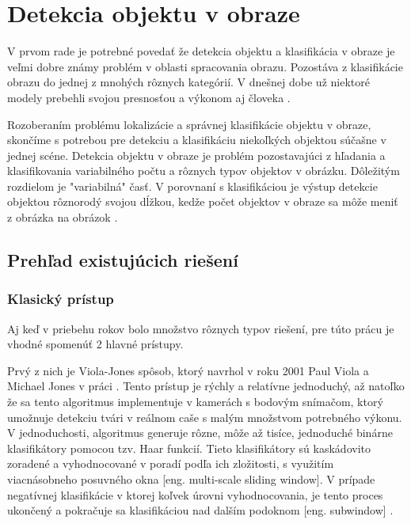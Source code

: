 
\section{Detekcia objektu v obraze}
\label{sec:detekcia}

V prvom rade je potrebné povedať že detekcia objektu a klasifikácia v obraze je veľmi dobre známy problém v oblasti spracovania obrazu.
Pozostáva z klasifikácie obrazu do jednej z mnohých rôznych kategórií.
V dnešnej dobe už niektoré modely prebehli svojou presnosťou a výkonom aj človeka \cite{prop:NNvsHuman}.

Rozoberaním problému lokalizácie a správnej klasifikácie objektu v obraze, skončíme s potrebou
    pre detekciu a klasifikáciu niekoľkých objektou súčašne v jednej scéne.
Detekcia objektu v obraze je problém pozostavajúci z hľadania a klasifikovania variabilného počtu a rôznych typov objektov v obrázku.
Dôležitým rozdielom je "variabilná" časť. V porovnaní s klasifikáciou je výstup detekcie objektou rôznorodý svojou dĺžkou, kedže
    počet objektov v obraze sa môže meniť z obrázka na obrázok \cite{odkaz:ObjectDetectionOverview}.

\subsection{Prehľad existujúcich riešení}

\subsubsection{Klasický prístup}
Aj keď v priebehu rokov bolo množstvo rôznych typov riešení, pre túto prácu je vhodné spomenúť 2 hlavné prístupy.

Prvý z nich je Viola-Jones spôsob, ktorý navrhol v roku 2001 Paul Viola a Michael Jones v práci \cite{prop:Viola2001RobustRF}.
Tento prístup je rýchly a relatívne jednoduchý, až natoľko že sa tento algoritmus implementuje v kamerách s bodovým snímačom, ktorý umožnuje
    detekciu tvári v reálnom caše s malým množstvom potrebného výkonu.
V jednoduchosti, algoritmus generuje rôzne, môže až tisíce, jednoduché binárne klasifikátory pomocou tzv. Haar funkcií.
Tieto klasifikátory sú kaskádovito zoradené a vyhodnocované v poradí podľa ich zložitosti, s využitím viacnásobneho posuvného okna [eng. multi-scale sliding window].
V prípade negatívnej klasifikácie v ktorej koľvek úrovni vyhodnocovania, je tento proces ukončený a pokračuje sa klasifikáciou nad dalším podoknom [eng. subwindow] \cite{prop:Viola2001RobustRF}.

